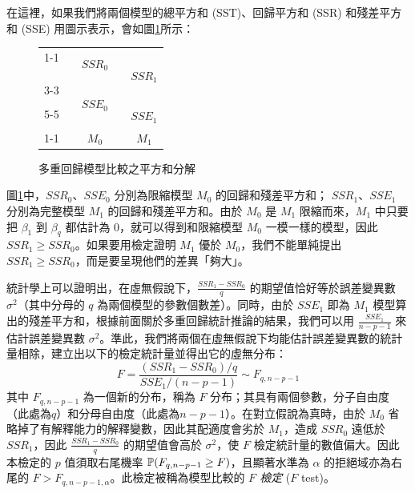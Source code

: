     \medskip
    
    在這裡，如果我們將兩個模型的總平方和 (SST)、回歸平方和 (SSR) 和殘差平方和 (SSE) 用圖示表示，會如圖\ref{fig:anova}所示：

    \begin{figure}[htbp]
        \centering
        \begin{tabular}{|c|c|c|c|c|}
            \cline{1-1}\cline{3-3}\cline{5-5}
            \multirow{8}{*}{$SST$} && \multirow{4}{*}{$SSR_0$} && \multirow{6}{*}{$SSR_1$}\\
             && &&  \\
             && &&  \\
             && &&  \\
            \cline{3-3}
             && \multirow{4}{*}{$SSE_0$} && \\
             && &&  \\
            \cline{5-5}
             && && \multirow{2}{*}{$SSE_1$} \\
             && &&  \\
            \cline{1-1}\cline{3-3}\cline{5-5}
            \multicolumn{1}{c}{}&\multicolumn{1}{c}{}& \multicolumn{1}{c}{$M_0$} &\multicolumn{1}{c}{}& \multicolumn{1}{c}{$M_1$} 
        \end{tabular}
        \caption{多重回歸模型比較之平方和分解}
        \label{fig:anova}
    \end{figure}

    圖\ref{fig:anova}中，$SSR_0$、$SSE_0$ 分別為限縮模型 $M_0$ 的回歸和殘差平方和； $SSR_1$、$SSE_1$ 分別為完整模型 $M_1$ 的回歸和殘差平方和。由於 $M_0$ 是 $M_1$ 限縮而來，$M_1$ 中只要把 $\beta_1$ 到 $\beta_q$ 都估計為 $0$，就可以得到和限縮模型 $M_0$ 一模一樣的模型，因此 $SSR_1 \ge SSR_0$。如果要用檢定證明 $M_1$ 優於 $M_0$，我們不能單純提出 $SSR_1 \ge SSR_0$，而是要呈現他們的差異「夠大」。

    \medskip

    統計學上可以證明出，在虛無假說下，$\frac{SSR_1-SSR_0}{q}$ 的期望值恰好等於誤差變異數 $\sigma^2$（其中分母的 $q$ 為兩個模型的參數個數差）。同時，由於 $SSE_1$ 即為 $M_1$ 模型算出的殘差平方和，根據前面關於多重回歸統計推論的結果，我們可以用 $\frac{SSE_1}{n-p-1}$ 來估計誤差變異數 $\sigma^2$。準此，我們將兩個在虛無假說下均能估計誤差變異數的統計量相除，建立出以下的檢定統計量並得出它的虛無分布：
    \[F = \frac{(SSR_1 - SSR_0)/q}{SSE_1/(n-p-1)} \sim F_{q, n-p-1}\]
    其中 $F_{q, n-p-1}$ 為一個新的分布，稱為 $F$ 分布；其具有兩個參數，分子自由度（此處為$q$）和分母自由度（此處為$n-p-1$）。在對立假說為真時，由於 $M_0$ 省略掉了有解釋能力的解釋變數，因此其配適度會劣於 $M_1$，造成 $SSR_0$ 遠低於 $SSR_1$，因此 $\frac{SSR_1-SSR_0}{q}$ 的期望值會高於 $\sigma^2$，使 $F$ 檢定統計量的數值偏大。因此本檢定的 $p$ 值須取右尾機率 $\mathbb{P}(F_{q, n-p-1} \ge F)$，且顯著水準為 $\alpha$ 的拒絕域亦為右尾的 $F > F_{q, n-p-1, \alpha}$。此檢定被稱為模型比較的 \textit{$F$ 檢定} ($F$ test)。

